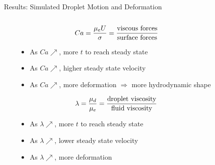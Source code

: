 \documentclass[final]{beamer}
\newlength{\sepwidth}
\newlength{\colwidth}
\newcommand{\separatorcolumn}{\begin{column}{\sepwidth}\end{column}}
\begin{document}
\begin{frame}[t]
\begin{columns}[t]
\begin{column}{\colwidth}
\begin{block}{Results: Simulated Droplet Motion and Deformation}
\begin{columns}
\begin{column}{.66\textwidth}
          \end{column}%
          \hfill%
          \begin{column}{.34 \textwidth} %
                \vspace{-1.5cm}
                \begin{align*}
                    \centering
                    Ca = \frac{\mu_e U}{\sigma} = \frac{\text{viscous forces}}{\text{surface forces}}
                \end{align*}
                \vspace{0.5cm}
                \begin{itemize}
                    \item As $Ca \nearrow$, more $t$ to reach steady state
                    \item As $Ca \nearrow$, higher steady state velocity
                    \item As $Ca \nearrow$, more deformation $\Rightarrow$ more hydrodynamic shape
                \end{itemize}

                \vspace{3cm}
                \begin{align*}
                    \centering
                    \lambda = \frac{\mu_d}{\mu_e} = \frac{\text{droplet viscosity}}{\text{fluid viscosity}}
                \end{align*}
                \vspace{0.5cm}
                \begin{itemize}
                    \item As $\lambda \nearrow$, more $t$ to reach steady state
                    \item As $\lambda \nearrow$, lower steady state velocity
                    \item As $\lambda \nearrow$, more deformation
                \end{itemize}
                

          \end{column}
        \end{columns}
        
    \end{block}

\end{column}

\separatorcolumn

\begin{column}{\colwidth}


\end{column}
\end{columns}
\end{frame}
\end{document}
